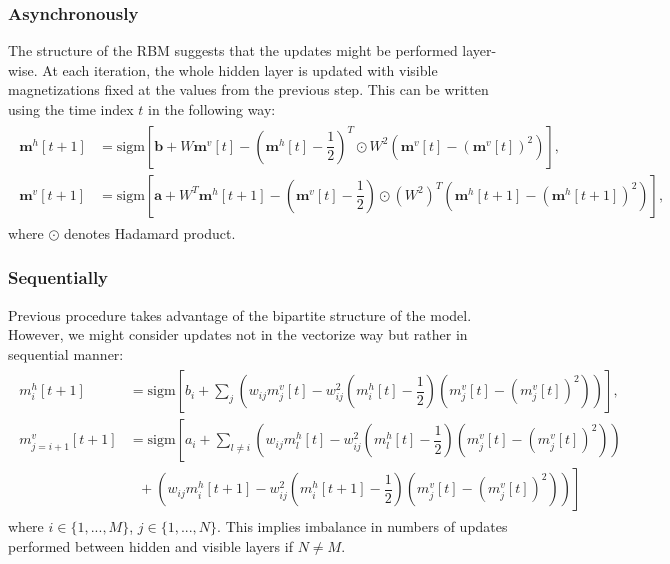 \documentclass[../report/report.tex]{subfiles}
\begin{document}
\subsubsection{Asynchronously}
The structure of the RBM suggests that the updates might be performed layer-wise. At each iteration, the whole hidden layer is updated with visible magnetizations fixed at the values from the previous step. This can be written using the time index $t$ in the following way: 
\begin{align}
\begin{split}
\mathbf{m}^h [t+1] & = \text{sigm} \left[  \mathbf{b} + W \mathbf{m}^v[t] - \left( \mathbf{m}^h[t] - \dfrac{1}{2}\right)^T \odot W^2 \left( \mathbf{m}^v[t] - ( \mathbf{m}^v[t])^2 \right) \right], \\
\mathbf{m}^v[t+1] & = \text{sigm} \left[  \mathbf{a} + W^T \mathbf{m}^h[t + 1] -\left( \mathbf{m}^v[t] - \dfrac{1}{2}\right) \odot (W^2)^T  \left(\mathbf{m}^h[t+1] - (\mathbf{m}^h[t+1])^2 \right) \right],
\label{eq:asynch}
\end{split}
\end{align}
where $\odot$ denotes Hadamard product. 

\subsubsection{Sequentially}
Previous procedure takes advantage of the bipartite structure of the model. However, we might consider updates not in the vectorize way but rather in sequential manner: 
\begin{align}
\begin{split}
m_i^{h}[t+1] & = \text{sigm} \left[b_i + \sum_j \left( w_{ij}m_j^{v}[t] - w_{ij}^2  (m_i^h[t] - \dfrac{1}{2}) \left(m_j^v[t] - (m_j^v[t])^2 \right)  \right)\right],  \\
m_{j = i+1}^v[t+1] & = \text{sigm} \left[ a_i + \sum_{l \neq i} \left( w_{ij}m_l^{h}[t] - w_{ij}^2  (m_l^h[t] - \dfrac{1}{2}) (m_j^v[t] - (m_j^v[t])^2)  \right)  \right.\\
& ~~~ + \left. \left( w_{ij}m_i^{h}[t +1] - w_{ij}^2  (m_i^h[t+1] - \dfrac{1}{2}) (m_j^v[t] - (m_j^v[t])^2)  \right) \right]
\end{split}
\label{eq:sequential}
\end{align}
where $i \in \{1, ..., M\}$, $j \in \{1,..., N \}$. This implies imbalance in numbers of updates performed between hidden and visible layers if $N \neq M$.
\end{document}
